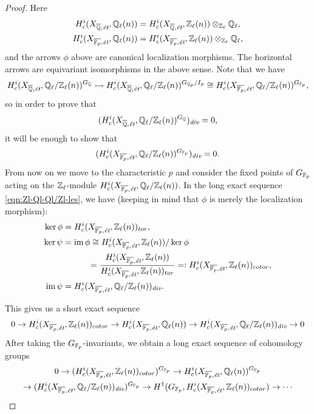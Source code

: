 \documentclass{article}
\numberwithin{equation}{section}
\begin{document}
\begin{proposition}
\begin{proof}
    Here
    \begin{align*}
      H_c^i (X_{\overline{\mathbb{Q}},\text{\it ét}}, \mathbb{Q}_\ell (n)) & = H_c^i (X_{\overline{\mathbb{Q}},\text{\it ét}}, \mathbb{Z}_\ell (n))\otimes_{\mathbb{Z}_\ell} \mathbb{Q}_\ell,\\
      H_c^i (X_{\overline{\mathbb{F}_p},\text{\it ét}}, \mathbb{Q}_\ell (n)) & = H_c^i (X_{\overline{\mathbb{F}_p},\text{\it ét}}, \mathbb{Z}_\ell (n))\otimes_{\mathbb{Z}_\ell} \mathbb{Q}_\ell,
    \end{align*}
    and the arrows $\phi$ above are canonical localization morphisms.
    The horizontal arrows are equivariant isomorphisms in the above sense. Note
    that we have
    \[ H^i_c (X_{\overline{\mathbb{Q}}, \text{\it ét}}, \mathbb{Q}_\ell/\mathbb{Z}_\ell (n))^{G_{\mathbb{Q}}} \rightarrowtail
    H^i_c (X_{\overline{\mathbb{Q}}, \text{\it ét}}, \mathbb{Q}_\ell/\mathbb{Z}_\ell (n))^{G_{\mathbb{Q}_p}/I_p}
    \cong H^i_c (X_{\overline{\mathbb{F}_p}, \text{\it ét}}, \mathbb{Q}_\ell/\mathbb{Z}_\ell (n))^{G_{\mathbb{F}_p}}, \]
    so in order to prove that
    $$(H^i_c (X_{\overline{\mathbb{Q}},\text{\it ét}}, \mathbb{Q}_\ell/\mathbb{Z}_\ell (n))^{G_{\mathbb{Q}}})_{\text{\it div}} = 0,$$
    it will be enough to show that
    $$(H^i_c (X_{\overline{\mathbb{F}_p},\text{\it ét}}, \mathbb{Q}_\ell/\mathbb{Z}_\ell (n))^{G_{\mathbb{F}_p}})_{\text{\it div}} = 0.$$
    From now on we move to the characteristic $p$ and consider the fixed points
    of $G_{\mathbb{F}_p}$ acting on the $\mathbb{Z}_\ell$-module
    $H^i_c (X_{\overline{\mathbb{F}_p},\text{\it ét}}, \mathbb{Q}_\ell/\mathbb{Z}_\ell (n))$.
    In the long exact sequence \eqref{eqn:Zl-Ql-Ql/Zl-les}, we have (keeping in
    mind that $\phi$ is merely the localization morphism):
    \begin{align*}
      \ker \phi & = H^i_c (X_{\overline{\mathbb{F}_p},\text{\it ét}}, \mathbb{Z}_\ell (n))_{tor},\\
      \ker \psi & = \operatorname{im} \phi \cong H^i_c (X_{\overline{\mathbb{F}_p},\text{\it ét}}, \mathbb{Z}_\ell (n)) / \ker \phi \\
      & \quad\quad\quad = \frac{H^i_c (X_{\overline{\mathbb{F}_p},\text{\it ét}}, \mathbb{Z}_\ell (n))}{H^i_c (X_{\overline{\mathbb{F}_p},\text{\it ét}}, \mathbb{Z}_\ell (n))_{tor}} =\mathrel{\mathop:} H^i_c (X_{\overline{\mathbb{F}_p},\text{\it ét}}, \mathbb{Z}_\ell (n))_{cotor},\\
      \operatorname{im} \psi & = H_c^i (X_{\overline{\mathbb{F}_p},\text{\it ét}}, \mathbb{Q}_\ell/\mathbb{Z}_\ell (n))_{\text{\it div}}.
    \end{align*}

    This gives us a short exact sequence
    \[ 0 \to H^i_c (X_{\overline{\mathbb{F}_p},\text{\it ét}}, \mathbb{Z}_\ell (n))_{cotor} \to
    H^i_c (X_{\overline{\mathbb{F}_p},\text{\it ét}}, \mathbb{Q}_\ell (n)) \to
    H^i_c (X_{\overline{\mathbb{F}_p},\text{\it ét}}, \mathbb{Q}_\ell/\mathbb{Z}_\ell (n))_{\text{\it div}} \to 0 \]
    After taking the $G_{\mathbb{F}_p}$-invariants, we obtain a long exact sequence
    of cohomology groups
    \begin{multline}
      \label{eqn:cohomology-long-exact-sequence-with-GFp}
      0 \to (H^i_c (X_{\overline{\mathbb{F}_p},\text{\it ét}}, \mathbb{Z}_\ell (n))_{cotor})^{G_{\mathbb{F}_p}} \to
      H^i_c (X_{\overline{\mathbb{F}_p},\text{\it ét}}, \mathbb{Q}_\ell (n))^{G_{\mathbb{F}_p}} \\
      \to (H^i_c (X_{\overline{\mathbb{F}_p},\text{\it ét}}, \mathbb{Q}_\ell/\mathbb{Z}_\ell (n))_{\text{\it div}})^{G_{\mathbb{F}_p}} \to
      H^1 (G_{\mathbb{F}_p}, H^i_c (X_{\overline{\mathbb{F}_p},\text{\it ét}}, \mathbb{Z}_\ell (n))_{cotor}) \to \cdots
    \end{multline}


\end{proof}
\end{proposition}
\end{document}
